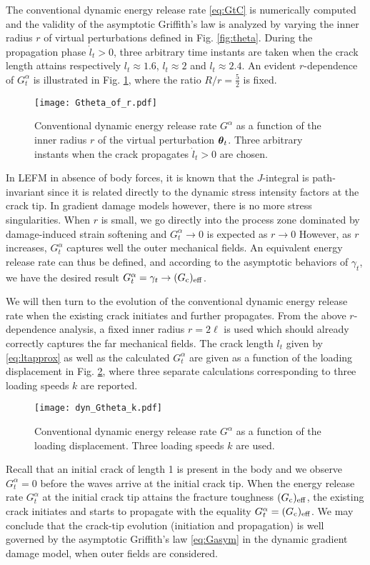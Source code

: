 The conventional dynamic energy release rate \eqref{eq:GtC} is numerically computed and the validity of the asymptotic Griffith's law is analyzed by varying the inner radius $r$ of virtual perturbations defined in Fig. \ref{fig:theta}. During the propagation phase $\dot{l}_t>0$, three arbitrary time instants are taken when the crack length attains respectively $l_t\approx 1.6$, $l_t\approx 2$ and $l_t\approx 2.4$. An evident $r$-dependence of $G^\alpha_t$ is illustrated in Fig. \ref{fig:indvelocity}, where the ratio $R/r=\frac{5}{2}$ is fixed.
\begin{figure}[htbp]
\centering
\texttt{[image: Gtheta\_of\_r.pdf]}
\caption{Conventional dynamic energy release rate $G^\alpha$ as a function of the inner radius $r$ of the virtual perturbation $\vtheta_t$. Three arbitrary instants when the crack propagates $\dot{l}_t>0$ are chosen.} \label{fig:indvelocity}
\end{figure}
In LEFM in absence of body forces, it is known that the $J$-integral is path-invariant since it is related directly to the dynamic stress intensity factors at the crack tip. In gradient damage models however, there is no more stress singularities. When $r$ is small, we go directly into the process zone dominated by damage-induced strain softening and $G^\alpha_t\to 0$ is expected as $r\to 0$ However, as $r$ increases, $G^\alpha_t$ captures well the outer mechanical fields. An equivalent energy release rate can thus be defined, and according to the asymptotic behaviors of $\gamma_t$, we have the desired result $G^\alpha_t=\gamma_t\to (G_\mathrm{c})_\mathrm{eff}$.

We will then turn to the evolution of the conventional dynamic energy release rate when the existing crack initiates and further propagates. From the above $r$-dependence analysis, a fixed inner radius $r=2\ell$ is used which should already correctly captures the far mechanical fields. The crack length $l_t$ given by \eqref{eq:ltapprox} as well as the calculated $G^\alpha_t$ are given as a function of the loading displacement in Fig. \ref{fig:evoGtGc}, where three separate calculations corresponding to three loading speeds $k$ are reported.
\begin{figure}[htbp]
\centering
\texttt{[image: dyn\_Gtheta\_k.pdf]}
\caption{Conventional dynamic energy release rate $G^\alpha$ as a function of the loading displacement. Three loading speeds $k$ are used.} \label{fig:evoGtGc}
\end{figure}
Recall that an initial crack of length 1 is present in the body and we observe $G^\alpha_t=0$ before the waves arrive at the initial crack tip. When the energy release rate $G^\alpha_t$ at the initial crack tip attains the fracture toughness $(G_\mathrm{c})_\mathrm{eff}$, the existing crack initiates and starts to propagate with the equality $G^\alpha_t=(G_\mathrm{c})_\mathrm{eff}$. We may conclude that the crack-tip evolution (initiation and propagation) is well governed by the asymptotic Griffith's law \eqref{eq:Gasym} in the dynamic gradient damage model, when outer fields are considered.

